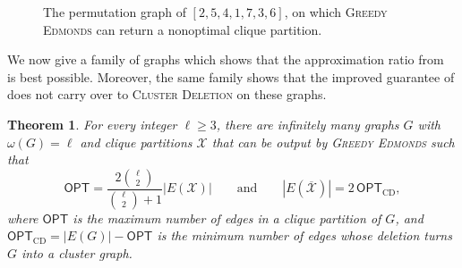 \documentclass[a4paper,fleqn]{cas-sc}
\newtheorem{thm}{Theorem}[section]
\theoremstyle{remark}
\theoremstyle{plain}
\newcommand{\cd}{\textsc{Cluster Deletion}}
\newcommand{\edmonds}{{\textsc{Greedy Edmonds}}}
\newcommand{\opt}{{\mathsf{OPT}}}
\begin{document}
\begin{figure}[h!]
\centering
{}
\caption{The permutation graph of $[2,5,4,1,7,3,6]$, on which \edmonds{} can return a nonoptimal
clique partition.}
\label{fig:greedy-edmonds-counterexample}
\end{figure}

We now give a family of graphs which shows that the approximation ratio from~ is best possible.  Moreover, the same family shows that the improved guarantee of  does not carry over to \cd{} on these graphs.

\begin{thm} \label{thm:tight}
For every integer $\ell\geq 3$, there are infinitely many graphs $G$
with $\omega(G)=\ell$ and clique partitions $\mathcal{X}$ that can
be output by \edmonds{} such that
\[
   \opt=
   \frac{2\binom{\ell}{2}}{\binom{\ell}{2}+1}
   |E(\mathcal{X})|
   \qquad\text{and}\qquad
   |E(\overline{\mathcal{X}})| = 2\,\opt_{\mathrm{CD}},
\]
where $\opt$ is the maximum number of edges in a clique partition of
$G$, and $\opt_{\mathrm{CD}}=|E(G)|-\opt$ is the minimum number of edges whose deletion turns $G$ into a cluster graph.
\end{thm}
\end{document}
